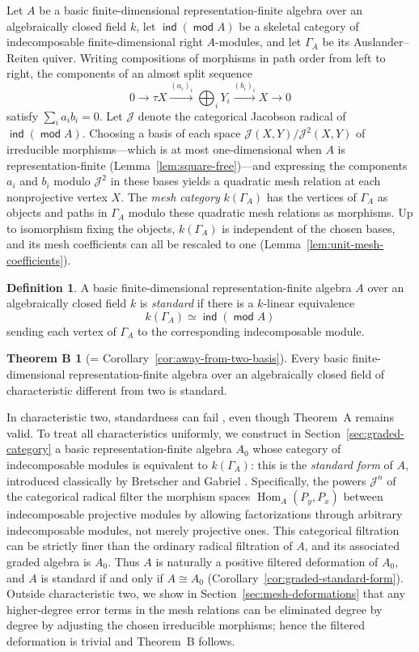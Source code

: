\documentclass[a4paper,reqno,11pt]{amsart}
\theoremstyle{definition}
\newtheorem{definition}[theorem]{Definition}
\newtheorem*{theoremB}{Theorem B}
\DeclareMathOperator{\modu}{\mathsf{mod}}
\DeclareMathOperator{\ind}{\mathsf{ind}}
\DeclareMathOperator{\Hom}{Hom}
\newcommand{\JJ}{\mathcal J}
\begin{document}
Let $A$ be a basic finite-dimensional representation-finite algebra over an
algebraically closed field $k$, let $\ind(\modu A)$ be a skeletal category
of indecomposable finite-dimensional right $A$-modules, and let $\Gamma_A$
be its Auslander--Reiten quiver. Writing compositions of morphisms in path
order from left to right, the components of an almost split sequence
\[
 0\longrightarrow\tau X\xrightarrow{(a_i)_i}
 \bigoplus_iY_i\xrightarrow{(b_i)_i}X\longrightarrow0
\]
satisfy $\sum_i a_i b_i=0$. Let $\JJ$ denote the categorical Jacobson radical
of $\ind(\modu A)$. Choosing a basis of each space $\JJ(X,Y)/\JJ^2(X,Y)$ of
irreducible morphisms—which is at most one-dimensional when $A$ is
representation-finite (Lemma~\ref{lem:square-free})—and expressing the
components $a_i$ and $b_i$ modulo $\JJ^2$ in these bases yields a quadratic
mesh relation at each nonprojective vertex $X$. The \emph{mesh category}
$k(\Gamma_A)$ has the vertices of $\Gamma_A$ as objects and paths in
$\Gamma_A$ modulo these quadratic mesh relations as morphisms. Up to
isomorphism fixing the objects, $k(\Gamma_A)$ is independent of the chosen
bases, and its mesh coefficients can all be rescaled to one
(Lemma~\ref{lem:unit-mesh-coefficients}).

\begin{definition}
\label{def:standardness}
A basic finite-dimensional representation-finite algebra $A$ over an
algebraically closed field $k$ is \emph{standard} if there is a $k$-linear equivalence
\[
 k(\Gamma_A)\simeq\ind(\modu A)
\]
sending each vertex of $\Gamma_A$ to the corresponding indecomposable module.
\end{definition}

\begin{theoremB}[= Corollary~\ref{cor:away-from-two-basis}]
Every basic finite-dimensional representation-finite algebra over an
algebraically closed field of characteristic different from two is standard.
\end{theoremB}

In characteristic two, standardness can fail
\cite[Section~3.7]{BongartzSurvey}, even though Theorem~A remains valid.
To treat all characteristics uniformly, we construct in
Section~\ref{sec:graded-category} a basic representation-finite algebra
$A_0$ whose category of indecomposable modules is equivalent to
$k(\Gamma_A)$: this is the \emph{standard form} of $A$, introduced
classically by Bretscher and Gabriel \cite{BretscherGabriel}. Specifically,
the powers $\JJ^n$ of the categorical radical filter the morphism spaces
$\Hom_A(P_y,P_x)$ between indecomposable projective modules by allowing
factorizations through arbitrary indecomposable modules, not merely
projective ones. This categorical filtration can be strictly finer than the
ordinary radical filtration of $A$, and its associated graded algebra is
$A_0$. Thus $A$ is naturally a positive filtered deformation of $A_0$, and
$A$ is standard if and only if $A\cong A_0$
(Corollary~\ref{cor:graded-standard-form}). Outside characteristic two, we
show in Section~\ref{sec:mesh-deformations} that any higher-degree error terms
in the mesh relations can be eliminated degree by degree by adjusting the
chosen irreducible morphisms; hence the filtered deformation is trivial and
Theorem~B follows.
\end{document}
